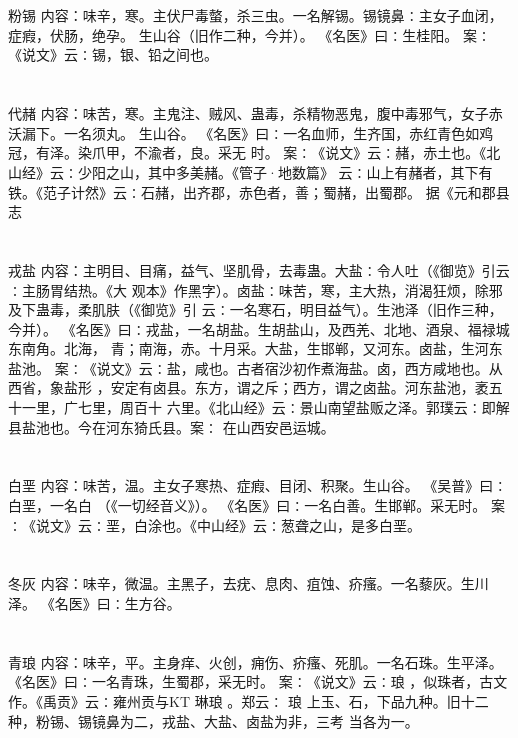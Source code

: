 \documentclass[12pt,UTF8]{ctexbook}
\begin{document}
\section{}粉锡
内容：味辛，寒。主伏尸毒螫，杀三虫。一名解锡。锡镜鼻∶主女子血闭，症瘕，伏肠，绝孕。 
生山谷（旧作二种，今并）。 
《名医》曰∶生桂阳。 
案∶《说文》云∶锡，银、铅之间也。 


\section{}代赭
内容：味苦，寒。主鬼注、贼风、蛊毒，杀精物恶鬼，腹中毒邪气，女子赤沃漏下。一名须丸。 
生山谷。 
《名医》曰∶一名血师，生齐国，赤红青色如鸡冠，有泽。染爪甲，不渝者，良。采无 
时。 
案∶《说文》云∶赭，赤土也。《北山经》云∶少阳之山，其中多美赭。《管子·地数篇》 
云∶山上有赭者，其下有铁。《范子计然》云∶石赭，出齐郡，赤色者，善；蜀赭，出蜀郡。 
据《元和郡县志 


\section{}戎盐
内容：主明目、目痛，益气、坚肌骨，去毒蛊。大盐∶令人吐（《御览》引云∶主肠胃结热。《大 
观本》作黑字）。卤盐∶味苦，寒，主大热，消渴狂烦，除邪及下蛊毒，柔肌肤（《御览》引 
云∶一名寒石，明目益气）。生池泽（旧作三种，今并）。 
《名医》曰∶戎盐，一名胡盐。生胡盐山，及西羌、北地、酒泉、福禄城东南角。北海， 
青；南海，赤。十月采。大盐，生邯郸，又河东。卤盐，生河东盐池。 
案∶《说文》云∶盐，咸也。古者宿沙初作煮海盐。卤，西方咸地也。从西省，象盐形 
，安定有卤县。东方，谓之斥；西方，谓之卤盐。河东盐池，袤五十一里，广七里，周百十 
六里。《北山经》云∶景山南望盐贩之泽。郭璞云∶即解县盐池也。今在河东猗氏县。案∶ 
在山西安邑运城。 


\section{}白垩
内容：味苦，温。主女子寒热、症瘕、目闭、积聚。生山谷。 
《吴普》曰∶白垩，一名白 （《一切经音义》）。 
《名医》曰∶一名白善。生邯郸。采无时。 
案∶《说文》云∶垩，白涂也。《中山经》云∶葱聋之山，是多白垩。 


\section{}冬灰
内容：味辛，微温。主黑子，去疣、息肉、疽蚀、疥瘙。一名藜灰。生川泽。 
《名医》曰∶生方谷。 


\section{}青琅
内容：味辛，平。主身痒、火创，痈伤、疥瘙、死肌。一名石珠。生平泽。 
《名医》曰∶一名青珠，生蜀郡，采无时。 
案∶《说文》云∶琅 ，似珠者，古文作。《禹贡》云∶雍州贡与KT 琳琅 。郑云∶ 
琅 
上玉、石，下品九种。旧十二种，粉锡、锡镜鼻为二，戎盐、大盐、卤盐为非，三考 
当各为一。 
\end{document}
